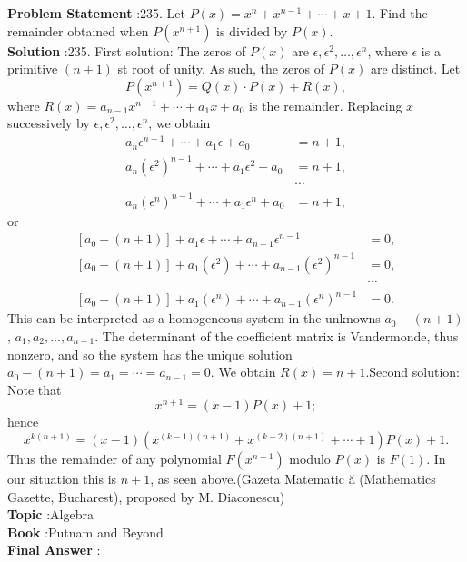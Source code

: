 \documentclass[10pt]{article}
\begin{document}
\textbf{Problem Statement} :235. Let $P(x)=x^{n}+x^{n-1}+\cdots+x+1$. Find the remainder obtained when $P\left(x^{n+1}\right)$ is divided by $P(x)$.\\
\textbf{Solution} :235. First solution: The zeros of $P(x)$ are $\epsilon, \epsilon^{2}, \ldots, \epsilon^{n}$, where $\epsilon$ is a primitive $(n+1)$ st root of unity. As such, the zeros of $P(x)$ are distinct. Let$$ P\left(x^{n+1}\right)=Q(x) \cdot P(x)+R(x), $$where $R(x)=a_{n-1} x^{n-1}+\cdots+a_{1} x+a_{0}$ is the remainder. Replacing $x$ successively by $\epsilon, \epsilon^{2}, \ldots, \epsilon^{n}$, we obtain$$ \begin{aligned} a_{n} \epsilon^{n-1}+\cdots+a_{1} \epsilon+a_{0} &=n+1, \\ a_{n}\left(\epsilon^{2}\right)^{n-1}+\cdots+a_{1} \epsilon^{2}+a_{0} &=n+1, \\ & \cdots \\ a_{n}\left(\epsilon^{n}\right)^{n-1}+\cdots+a_{1} \epsilon^{n}+a_{0} &=n+1, \end{aligned} $$or$$ \begin{aligned} {\left[a_{0}-(n+1)\right]+a_{1} \epsilon+\cdots+a_{n-1} \epsilon^{n-1} } &=0, \\ {\left[a_{0}-(n+1)\right]+a_{1}\left(\epsilon^{2}\right)+\cdots+a_{n-1}\left(\epsilon^{2}\right)^{n-1} } &=0, \\ & \cdots \\ {\left[a_{0}-(n+1)\right]+a_{1}\left(\epsilon^{n}\right)+\cdots+a_{n-1}\left(\epsilon^{n}\right)^{n-1} } &=0 . \end{aligned} $$This can be interpreted as a homogeneous system in the unknowns $a_{0}-(n+1)$, $a_{1}, a_{2}, \ldots, a_{n-1}$. The determinant of the coefficient matrix is Vandermonde, thus nonzero, and so the system has the unique solution $a_{0}-(n+1)=a_{1}=\cdots=a_{n-1}=0$. We obtain $R(x)=n+1$.Second solution: Note that$$ x^{n+1}=(x-1) P(x)+1 ; $$hence$$ x^{k(n+1)}=(x-1)\left(x^{(k-1)(n+1)}+x^{(k-2)(n+1)}+\cdots+1\right) P(x)+1 . $$Thus the remainder of any polynomial $F\left(x^{n+1}\right)$ modulo $P(x)$ is $F(1)$. In our situation this is $n+1$, as seen above.(Gazeta Matematic ă (Mathematics Gazette, Bucharest), proposed by M. Diaconescu) \\
\textbf{Topic} :Algebra\\
\textbf{Book} :Putnam and Beyond\\
\textbf{Final Answer} :\\
\end{document}
